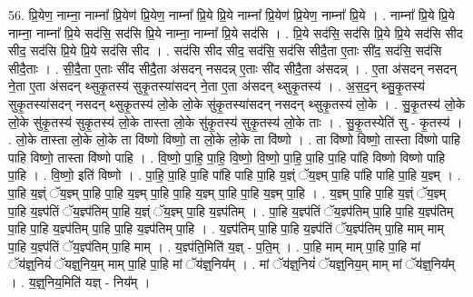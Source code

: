 \documentclass[17pt]{extarticle}
\begin{document}
56. प्रि॒येण॒ नाम्ना॒ नाम्ना᳚ प्रि॒येण॑ प्रि॒येण॒ नाम्ना᳚ प्रि॒ये प्रि॒ये नाम्ना᳚ प्रि॒येण॑ प्रि॒येण॒ नाम्ना᳚ प्रि॒ये । . नाम्ना᳚ प्रि॒ये प्रि॒ये नाम्ना॒ नाम्ना᳚ प्रि॒ये सद॑सि॒ सद॑सि प्रि॒ये नाम्ना॒ नाम्ना᳚ प्रि॒ये सद॑सि । . प्रि॒ये सद॑सि॒ सद॑सि प्रि॒ये प्रि॒ये सद॑सि सीद सीद॒ सद॑सि प्रि॒ये प्रि॒ये सद॑सि सीद । . सद॑सि सीद सीद॒ सद॑सि॒ सद॑सि सीदै॒ता ए॒ताः सी॑द॒ सद॑सि॒ सद॑सि सीदै॒ताः । . सी॒दै॒ता ए॒ताः सी॑द सीदै॒ता अ॑सदन् नसदन्न् ए॒ताः सी॑द सीदै॒ता अ॑सदन्न् । . ए॒ता अ॑सदन् नसदन् ने॒ता ए॒ता अ॑सदन् थ्सुकृ॒तस्य॑ सुकृ॒तस्या॑सदन् ने॒ता ए॒ता अ॑सदन् थ्सुकृ॒तस्य॑ । . अ॒स॒द॒न् थ्सु॒कृ॒तस्य॑ सुकृ॒तस्या॑सदन् नसदन् थ्सुकृ॒तस्य॑ लो॒के लो॒के सु॑कृ॒तस्या॑सदन् नसदन् थ्सुकृ॒तस्य॑ लो॒के । . सु॒कृ॒तस्य॑ लो॒के लो॒के सु॑कृ॒तस्य॑ सुकृ॒तस्य॑ लो॒के तास्ता लो॒के सु॑कृ॒तस्य॑ सुकृ॒तस्य॑ लो॒के ताः । . सु॒कृ॒तस्येति॑ सु - कृ॒तस्य॑ । . लो॒के तास्ता लो॒के लो॒के ता वि॑ष्णो विष्णो॒ ता लो॒के लो॒के ता वि॑ष्णो । . ता वि॑ष्णो विष्णो॒ तास्ता वि॑ष्णो पाहि पाहि विष्णो॒ तास्ता वि॑ष्णो पाहि । . वि॒ष्णो॒ पा॒हि॒ पा॒हि॒ वि॒ष्णो॒ वि॒ष्णो॒ पा॒हि॒ पा॒हि पा॒हि पा॑हि विष्णो विष्णो पाहि पा॒हि । . वि॒ष्णो॒ इति॑ विष्णो । . पा॒हि॒ पा॒हि पा॒हि पा॑हि पाहि पा॒हि य॒ज्ञ्ं ॅय॒ज्ञ्म् पा॒हि पा॑हि पाहि पा॒हि य॒ज्ञ्म् । . पा॒हि य॒ज्ञ्ं ॅय॒ज्ञ्म् पा॒हि पा॒हि य॒ज्ञ्म् पा॒हि पा॒हि य॒ज्ञ्म् पा॒हि पा॒हि य॒ज्ञ्म् पा॒हि । . य॒ज्ञ्म् पा॒हि पा॒हि य॒ज्ञ्ं ॅय॒ज्ञ्म् पा॒हि य॒ज्ञ्प॑तिं ॅय॒ज्ञ्प॑तिम् पा॒हि य॒ज्ञ्ं ॅय॒ज्ञ्म् पा॒हि य॒ज्ञ्प॑तिम् । . पा॒हि य॒ज्ञ्प॑तिं ॅय॒ज्ञ्प॑तिम् पा॒हि पा॒हि य॒ज्ञ्प॑तिम् पा॒हि पा॒हि य॒ज्ञ्प॑तिम् पा॒हि पा॒हि य॒ज्ञ्प॑तिम् पा॒हि । . य॒ज्ञ्प॑तिम् पा॒हि पा॒हि य॒ज्ञ्प॑तिं ॅय॒ज्ञ्प॑तिम् पा॒हि माम् माम् पा॒हि य॒ज्ञ्प॑तिं ॅय॒ज्ञ्प॑तिम् पा॒हि माम् । . य॒ज्ञ्प॑ति॒मिति॑ य॒ज्ञ् - प॒ति॒म् । . पा॒हि माम् माम् पा॒हि पा॒हि मां ॅय॑ज्ञ्॒नियं॑ ॅयज्ञ्॒निय॒म् माम् पा॒हि पा॒हि मां ॅय॑ज्ञ्॒निय᳚म् । . मां ॅय॑ज्ञ्॒नियं॑ ॅयज्ञ्॒निय॒म् माम् मां ॅय॑ज्ञ्॒निय᳚म् । . य॒ज्ञ्॒निय॒मिति॑ यज्ञ् - निय᳚म् । \newline
\pagebreak
{}
\end{document}
